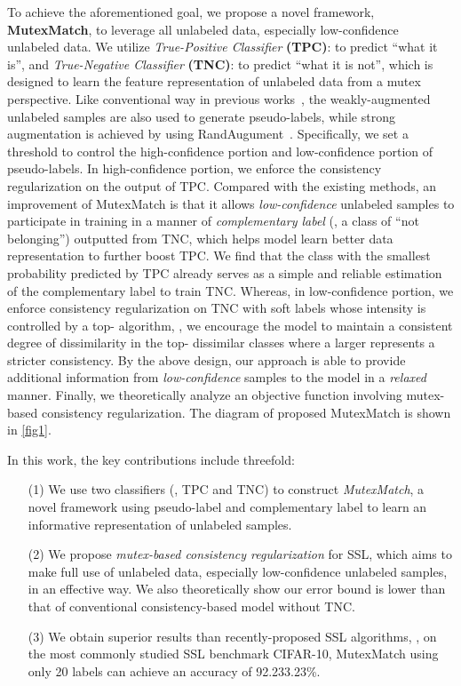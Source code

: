 \documentclass[lettersize,journal]{IEEEtran}
\theoremstyle{plain}
\theoremstyle{definition}
\theoremstyle{remark}
\begin{document}
To achieve the aforementioned goal, we propose a novel framework, \textbf{MutexMatch}, to leverage all unlabeled data, especially low-confidence unlabeled data. We utilize \textit{True-Positive Classifier} \textbf{(TPC)}: to predict ``what it is'', and \textit{True-Negative Classifier} \textbf{(TNC)}: to predict ``what it is not'', which is designed to learn the feature representation of unlabeled data from a mutex perspective. 
Like conventional way in previous works~\cite{sohn2020fixmatch}, the weakly-augmented unlabeled samples are also used to generate pseudo-labels, while strong augmentation is achieved by using RandAugument~\cite{cubuk2020randaugment}. 
Specifically, we set a threshold to control the high-confidence portion and low-confidence portion of pseudo-labels. In high-confidence portion, we enforce the consistency regularization on the output of TPC. 
Compared with the existing methods, an improvement of MutexMatch is that it allows \textit{low-confidence} unlabeled samples to participate in training in a manner of \textit{complementary label} (\ie, a class of ``not belonging'') outputted from TNC, which helps model learn better data representation to further boost TPC. We find that the class with the smallest probability predicted by TPC already serves as a simple and reliable estimation of the complementary label to train TNC. Whereas, in low-confidence portion, we enforce consistency regularization on TNC with soft labels whose intensity is controlled by
a top- algorithm, \ie, we encourage the model to maintain a consistent degree of dissimilarity in the top- dissimilar classes where a larger  represents a stricter consistency.  
By the above design, our approach is able to provide additional information from \textit{low-confidence} samples to the model in a \textit{relaxed} manner.
Finally, we theoretically analyze an objective function involving mutex-based consistency regularization. The diagram of proposed MutexMatch is shown in \cref{fig1}.

In this work, the key contributions include threefold: 
\begin{enumerate}
    \item[(1)] We use two classifiers (\ie, TPC and TNC) to construct \textit{MutexMatch}, a novel framework using pseudo-label and complementary label to learn an informative representation of unlabeled samples.  
    \item[(2)] We propose \textit{mutex-based consistency regularization} for SSL, which aims to make full use of unlabeled data, especially low-confidence unlabeled samples, in an effective way. We also theoretically show our error bound is lower than that of conventional consistency-based model without TNC.
    \item[(3)] We obtain superior results than recently-proposed SSL algorithms, \eg, on the most commonly studied SSL benchmark  CIFAR-10, MutexMatch using only 20 labels can achieve an accuracy of 92.233.23\%.
\end{enumerate}
\end{document}
